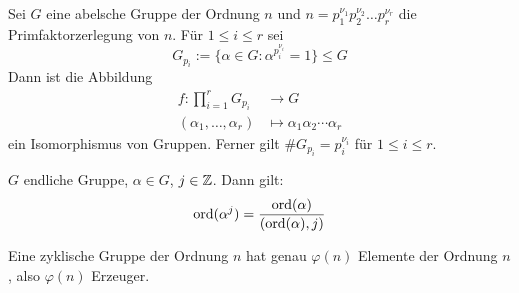 \begin{falko} \label{F4.2}
	Sei $G$ eine abelsche Gruppe der Ordnung $n$ und $n = p_1^{\nu_1} p_2^{\nu_2} \dots p_r^{\nu_r}$ die Primfaktorzerlegung von $n$. Für $1 \leq i \leq r$ sei
	\[ G_{p_i} := \{\alpha \in G : \alpha^{p_i^{\nu_i}} = 1 \} \leq G \]
	Dann ist die Abbildung
	\begin{equation}
	\begin{aligned}
		f\colon \prod_{i=1}^{r} G_{p_i} &\longrightarrow G \\
		(\alpha_1,\dots,\alpha_r) &\longmapsto \alpha_1 \alpha_2 \cdots \alpha_r \label{eq_F4.2}
	\end{aligned}
	\end{equation}
	ein Isomorphismus von Gruppen. Ferner gilt $\# G_{p_i} = p_i^{\nu_i}$ für $1 \leq i \leq r$.
\end{falko}

	$G$ endliche Gruppe, $\alpha \in G$, $j \in \mathbb{Z}$. Dann gilt:
	\[ \operatorname{ord}(\alpha^j) = \frac{\operatorname{ord}(\alpha)}{(\operatorname{ord}(\alpha),j)} \]
	
	Eine zyklische Gruppe der Ordnung $n$ hat genau $\varphi(n)$ Elemente der Ordnung $n$, also $\varphi(n)$ Erzeuger.